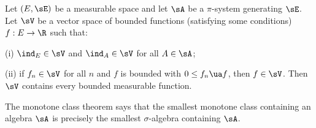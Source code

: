 \begin{theorem}\label{thm:monotone_class}
Let $(E, \sE)$ be a measurable space and let $\sA$ be a $\pi$-system generating $\sE$. Let $\sV$ be a vector space of bounded functions (satisfying some conditions) $f : E \to \R$ such that:
\ben
\item [(i)] $\ind_E \in \sV$ and $\ind_A \in \sV$ for all $A \in \sA$;
\item [(ii)] if $f_n \in \sV$ for all $n$ and $f$ is bounded with $0 \leq f_n \ua f$, then $f \in \sV$.
\een
Then $\sV$ contains every bounded measurable function.
\end{theorem}
\begin{remark}
The monotone class theorem says that the smallest monotone class containing an algebra $\sA$ is precisely the smallest $\sigma$-algebra containing $\sA$.
\end{remark}
